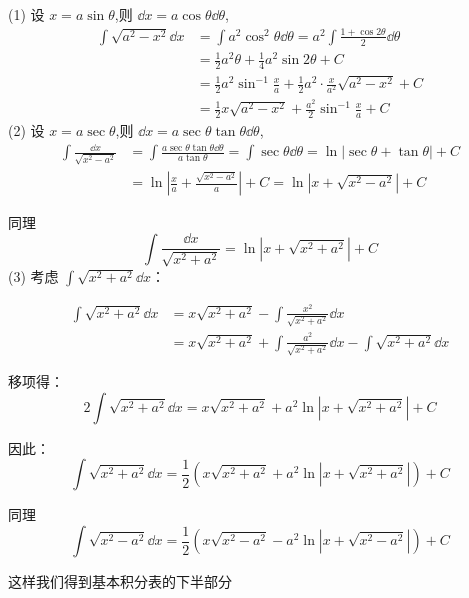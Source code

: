 \begin{solution}
	(1) 设 $x = a \sin \theta$,则 $\dd x = a \cos \theta \dd \theta$,
	\[\begin{aligned}
		\int \sqrt{a^2 - x^2} \dd x &= \int a^2 \cos^2 \theta \dd \theta = a^2 \int \frac{1 + \cos 2\theta}{2} \dd \theta\\
		&= \frac{1}{2} a^2 \theta + \frac{1}{4} a^2 \sin 2\theta + C\\	&= \frac{1}{2} a^2 \sin^{-1} \frac{x}{a} + \frac{1}{2} a^2 \cdot \frac{x}{a^2} \sqrt{a^2 - x^2} + C\\&= \frac{1}{2} x \sqrt{a^2 - x^2} + \frac{a^2}{2} \sin^{-1} \frac{x}{a} + C
	\end{aligned}\]
	(2) 设 $x = a \sec \theta$,则 $\dd x = a \sec \theta \tan \theta \dd \theta$,
	\[\begin{aligned}
		\int \frac{\dd x}{ \sqrt{x^2 - a^2}} &= \int \frac{a \sec \theta \tan \theta \dd \theta}{ a \tan \theta} = \int \sec \theta \dd \theta = \ln |\sec \theta + \tan \theta| + C\\&= \ln \left| \frac{x}{a} + \frac{\sqrt{x^2 - a^2}}{a} \right| + C = \ln \left| x + \sqrt{x^2 - a^2} \right| + C
	\end{aligned}\]
	
	
	同理
	\[
	\int \frac{\dd x}{\sqrt{x^2 + a^2}} = \ln \left| x + \sqrt{x^2 + a^2} \right| + C
	\]
	(3) 考虑 $\displaystyle\int \sqrt{x^2 + a^2} \dd x$：
	
	\[\begin{aligned}
		\int \sqrt{x^2 + a^2} \dd x &= x \sqrt{x^2 + a^2} - \int \frac{x^2}{\sqrt{x^2 + a^2}} \dd x\\& = x \sqrt{x^2 + a^2} + \int \frac{a^2}{\sqrt{x^2 + a^2}} \dd x - \int \sqrt{x^2 + a^2} \dd x
	\end{aligned}\]
	
	移项得：
	\[
	2 \int \sqrt{x^2 + a^2} \dd x = x \sqrt{x^2 + a^2} + a^2 \ln \left| x + \sqrt{x^2 + a^2} \right| + C
	\]
	
	因此：
	\[
	\int \sqrt{x^2 + a^2} \dd x = \frac{1}{2} \left( x \sqrt{x^2 + a^2} + a^2 \ln \left| x + \sqrt{x^2 + a^2} \right| \right) + C
	\]
	
	同理
	\[
	\int \sqrt{x^2 - a^2} \dd x = \frac{1}{2} \left( x \sqrt{x^2 - a^2} - a^2 \ln \left| x + \sqrt{x^2 - a^2} \right| \right) + C
	\]
\end{solution}
这样我们得到基本积分表的下半部分
